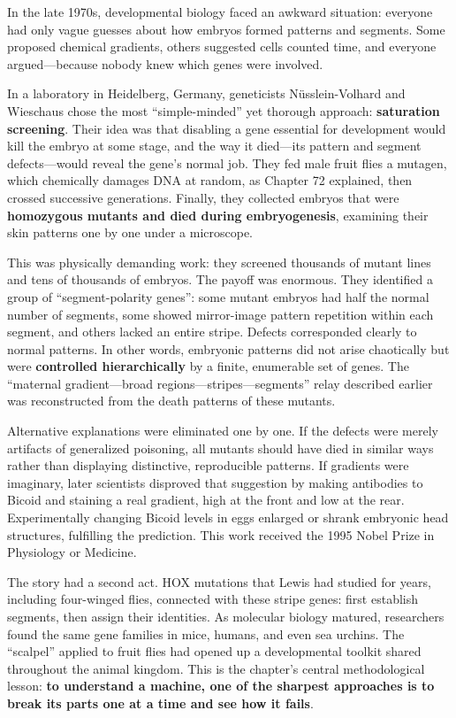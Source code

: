 \begin{zhengju}
In the late 1970s, developmental biology faced an awkward situation: everyone had only vague guesses about how embryos formed patterns and segments. Some proposed chemical gradients, others suggested cells counted time, and everyone argued---because nobody knew which genes were involved.

In a laboratory in Heidelberg, Germany, geneticists Nüsslein-Volhard and Wieschaus chose the most ``simple-minded'' yet thorough approach: \textbf{saturation screening}. Their idea was that disabling a gene essential for development would kill the embryo at some stage, and the way it died---its pattern and segment defects---would reveal the gene's normal job. They fed male fruit flies a mutagen, which chemically damages DNA at random, as Chapter 72 explained, then crossed successive generations. Finally, they collected embryos that were \textbf{homozygous mutants and died during embryogenesis}, examining their skin patterns one by one under a microscope.

This was physically demanding work: they screened thousands of mutant lines and tens of thousands of embryos. The payoff was enormous. They identified a group of ``segment-polarity genes'': some mutant embryos had half the normal number of segments, some showed mirror-image pattern repetition within each segment, and others lacked an entire stripe. Defects corresponded clearly to normal patterns. In other words, embryonic patterns did not arise chaotically but were \textbf{controlled hierarchically} by a finite, enumerable set of genes. The ``maternal gradient---broad regions---stripes---segments'' relay described earlier was reconstructed from the death patterns of these mutants.

Alternative explanations were eliminated one by one. If the defects were merely artifacts of generalized poisoning, all mutants should have died in similar ways rather than displaying distinctive, reproducible patterns. If gradients were imaginary, later scientists disproved that suggestion by making antibodies to Bicoid and staining a real gradient, high at the front and low at the rear. Experimentally changing Bicoid levels in eggs enlarged or shrank embryonic head structures, fulfilling the prediction. This work received the 1995 Nobel Prize in Physiology or Medicine.

The story had a second act. HOX mutations that Lewis had studied for years, including four-winged flies, connected with these stripe genes: first establish segments, then assign their identities. As molecular biology matured, researchers found the same gene families in mice, humans, and even sea urchins. The ``scalpel'' applied to fruit flies had opened up a developmental toolkit shared throughout the animal kingdom. This is the chapter's central methodological lesson: \textbf{to understand a machine, one of the sharpest approaches is to break its parts one at a time and see how it fails}.
\end{zhengju}

